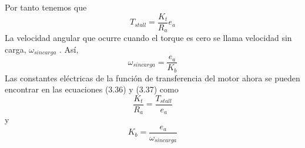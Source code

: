 Por tanto tenemos que
\begin{equation}
	T_{stall} = \frac{K_t}{R_a}e_a
\end{equation}
La velocidad angular que ocurre cuando el torque es cero se llama velocidad sin carga, $\omega_{sin carga}$ . Así,
\begin{equation}
	\omega_{sin carga} = \frac{e_a}{K_b}
\end{equation}
Las constantes eléctricas de la función de transferencia del motor ahora se pueden encontrar en las ecuaciones (3.36) y (3.37) como
\begin{equation}
	\frac{K_t}{R_a} = \frac{T_{stall}}{e_a}
\end{equation}
y
\begin{equation}
	K_b = \frac{e_a}{\omega_{sincarga}}
\end{equation}